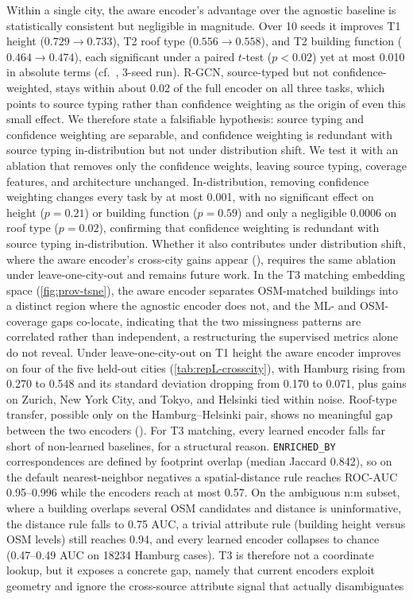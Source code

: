 \documentclass[sigconf,authordraft]{acmart}
\begin{document}
Within a single city, the aware encoder's advantage over the agnostic baseline is statistically consistent but negligible in magnitude. Over \num{10} seeds it improves T1 height ($\num{0.729}\rightarrow\num{0.733}$), T2 roof type ($\num{0.556}\rightarrow\num{0.558}$), and T2 building function ($\num{0.464}\rightarrow\num{0.474}$), each significant under a paired $t$-test ($p<\num{0.02}$) yet at most \num{0.010} in absolute terms (cf.~, \num{3}-seed run). R-GCN, source-typed but not confidence-weighted, stays within about \num{0.02} of the full encoder on all three tasks, which points to source typing rather than confidence weighting as the origin of even this small effect. We therefore state a falsifiable hypothesis: source typing and confidence weighting are separable, and confidence weighting is redundant with source typing in-distribution but not under distribution shift. We test it with an ablation that removes only the confidence weights, leaving source typing, coverage features, and architecture unchanged. In-distribution, removing confidence weighting changes every task by at most \num{0.001}, with no significant effect on height ($p=\num{0.21}$) or building function ($p=\num{0.59}$) and only a negligible \num{0.0006} on roof type ($p=\num{0.02}$), confirming that confidence weighting is redundant with source typing in-distribution. Whether it also contributes under distribution shift, where the aware encoder's cross-city gains appear (), requires the same ablation under leave-one-city-out and remains future work. In the T3 matching embedding space (\cref{fig:prov-tsne}), the aware encoder separates OSM-matched buildings into a distinct region where the agnostic encoder does not, and the ML- and OSM-coverage gaps co-locate, indicating that the two missingness patterns are correlated rather than independent, a restructuring the supervised metrics alone do not reveal. Under leave-one-city-out on T1 height the aware encoder improves on four of the five held-out cities (\cref{tab:repL-crosscity}), with Hamburg rising from \num{0.270} to \num{0.548} and its standard deviation dropping from \num{0.170} to \num{0.071}, plus gains on Zurich, New York City, and Tokyo, and Helsinki tied within noise. Roof-type transfer, possible only on the Hamburg--Helsinki pair, shows no meaningful gap between the two encoders (). For T3 matching, every learned encoder falls far short of non-learned baselines, for a structural reason. \texttt{ENRICHED\_BY} correspondences are defined by footprint overlap (median Jaccard \num{0.842}), so on the default nearest-neighbor negatives a spatial-distance rule reaches ROC-AUC \num{0.95}--\num{0.996} while the encoders reach at most \num{0.57}. On the ambiguous n:m subset, where a building overlaps several OSM candidates and distance is uninformative, the distance rule falls to \num{0.75} AUC, a trivial attribute rule (building height versus OSM levels) still reaches \num{0.94}, and every learned encoder collapses to chance (\num{0.47}--\num{0.49} AUC on \num{18234} Hamburg cases). T3 is therefore not a coordinate lookup, but it exposes a concrete gap, namely that current encoders exploit geometry and ignore the cross-source attribute signal that actually disambiguates 
\end{document}
